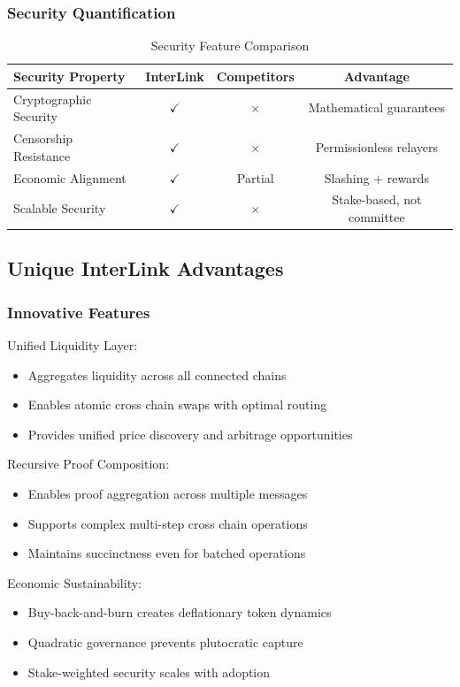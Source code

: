\documentclass[11pt,a4paper]{article}
\begin{document}
\subsubsection{Security Quantification}

\begin{table}[H]
\centering
\begin{tabular}{@{}lccc@{}}
\toprule
Security Property & InterLink & Competitors & Advantage \\ \midrule
Cryptographic Security & $\checkmark$ & $\times$ & Mathematical guarantees \\
Censorship Resistance & $\checkmark$ & $\times$ & Permissionless relayers \\
Economic Alignment & $\checkmark$ & Partial & Slashing + rewards \\
Scalable Security & $\checkmark$ & $\times$ & Stake-based, not committee \\
\end{tabular}
\caption{Security Feature Comparison}
\end{table}

\subsection{Unique InterLink Advantages}

\subsubsection{Innovative Features}

Unified Liquidity Layer:
\begin{itemize}
    \item Aggregates liquidity across all connected chains
    \item Enables atomic cross chain swaps with optimal routing
    \item Provides unified price discovery and arbitrage opportunities
\end{itemize}

Recursive Proof Composition:
\begin{itemize}
    \item Enables proof aggregation across multiple messages
    \item Supports complex multi-step cross chain operations
    \item Maintains succinctness even for batched operations
\end{itemize}

Economic Sustainability:
\begin{itemize}
    \item Buy-back-and-burn creates deflationary token dynamics
    \item Quadratic governance prevents plutocratic capture
    \item Stake-weighted security scales with adoption
\end{itemize}
\end{document}
